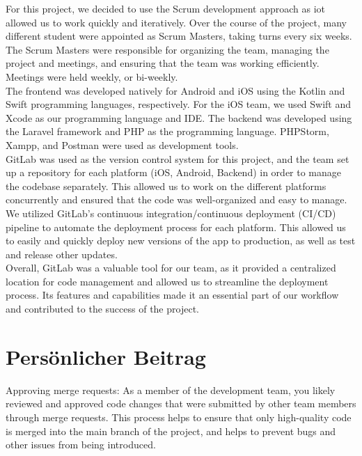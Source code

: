 \documentclass[sf-font,usefira,english]{uulm/sp/article}
\begin{document}
For this project, we decided to use the Scrum development approach 
as iot allowed us to work quickly and iteratively.
Over the course of the project, many different student were appointed as Scrum Masters, taking turns every six weeks.
The Scrum Masters were responsible for organizing the team,
managing the project and meetings, and ensuring that the team was working efficiently.
Meetings were held weekly, or bi-weekly.\\

The frontend was developed natively for Android and iOS using the Kotlin and Swift programming languages, respectively.
For the iOS team, we used Swift and Xcode as our programming language and IDE.
The backend was developed using the Laravel framework and PHP as the programming language.
PHPStorm, Xampp, and Postman were used as development tools.\\

GitLab was used as the version control system for this project, 
and the team set up a repository for each platform (iOS, Android, Backend) 
in order to manage the codebase separately. 
This allowed us to work on the different platforms concurrently 
and ensured that the code was well-organized and easy to manage.\\

We utilized GitLab's continuous integration/continuous deployment (CI/CD) 
pipeline to automate the deployment process for each platform. 
This allowed us to easily and quickly deploy new versions of the app to production, 
as well as test and release other updates.\\

Overall, GitLab was a valuable tool for our team, 
as it provided a centralized location for code management 
and allowed us to streamline the deployment process. 
Its features and capabilities made it an essential part of our workflow 
and contributed to the success of the project.\\



\section{Persönlicher Beitrag}
Approving merge requests: As a member of the development team, you likely reviewed and approved code changes that were submitted by other team members through merge requests. This process helps to ensure that only high-quality code is merged into the main branch of the project, and helps to prevent bugs and other issues from being introduced.
\end{document}
